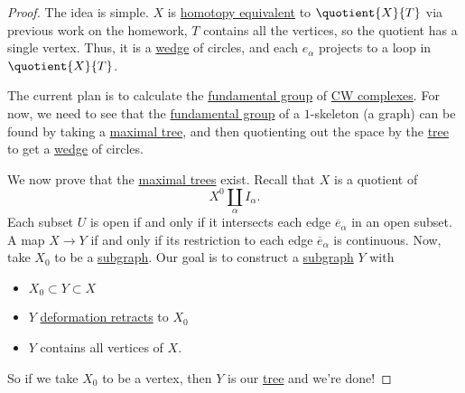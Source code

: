 \begin{proof}
	The idea is simple. \(X\) is \hyperref[def:homotopy-equivalence]{homotopy equivalent} to \(\quotient{X}{T}\) via previous work on the homework,
	\(T\) contains all the vertices, so the quotient has a single vertex. Thus, it is a \hyperref[sssec:Wedge-sum]{wedge} of circles, and each
	\(e_\alpha \) projects to a loop in \(\quotient{X}{T} \).
	\begin{figure}[H]
		\centering
		\label{fig:pf:lec12-1}
	\end{figure}

	\par The current plan is to calculate the  \hyperref[def:fundamental-group]{fundamental group} of \hyperref[def:CW-Complex]{CW complexes}.
	For now, we need to see that the \hyperref[def:fundamental-group]{fundamental group} of a \(1\)-skeleton (a graph) can be found by taking
	a \hyperref[def:maximal-tree]{maximal tree}, and then quotienting out the space by the \hyperref[def:tree]{tree} to get a \hyperref[sssec:Wedge-sum]{wedge} of circles.
	\begin{figure}[H]
		\centering
		\label{fig:pf:lec12-2}
	\end{figure}

	\par We now prove that the \hyperref[def:maximal-tree]{maximal trees} exist. Recall that \(X\) is a quotient of
	\[
		X^0\coprod_\alpha I_\alpha.
	\]
	Each subset \(U\) is open if and only if it intersects each edge \(\overline{e} _\alpha \) in an open subset. A map \(X\to Y\) if and only if
	its restriction to each edge \(\overline{e} _\alpha \) is continuous. Now, take \(X_0\) to be a \hyperref[def:subgraph]{subgraph}.
	Our goal is to construct a \hyperref[def:subgraph]{subgraph} \(Y\) with
	\begin{itemize}
		\item \(X_0 \subset Y\subset X\)
		\item \(Y\) \hyperref[def:deformation-retraction]{deformation retracts} to \(X_0\)
		\item \(Y\) contains all vertices of \(X\).
	\end{itemize}

	So if we take \(X_0\) to be a vertex, then \(Y\) is our \hyperref[def:tree]{tree} and we're done!


\end{proof}
